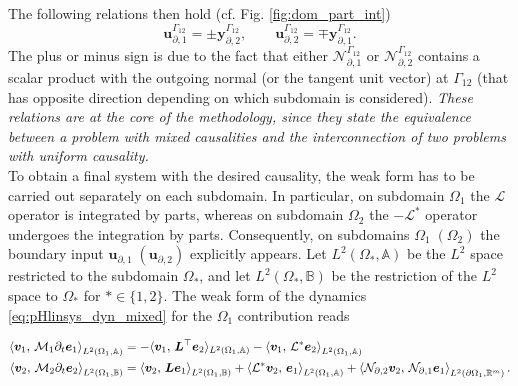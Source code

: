 The following relations then hold (cf. Fig. \ref{fig:dom_part_int})
\begin{equation}\label{eq:int_var}
\bm{u}_{\partial, 1}^{\Gamma_{12}} =\pm \bm{y}_{\partial, 2}^{\Gamma_{12}}, \qquad \bm{u}_{\partial, 2}^{\Gamma_{12}} = \mp \bm{y}_{\partial, 1}^{\Gamma_{12}}.
\end{equation}
The plus or minus sign is due to the fact that either $\mathcal{N}_{\partial, 1}^{\Gamma_{12}}$ or $\mathcal{N}_{\partial, 2}^{\Gamma_{12}}$ contains a scalar product with the outgoing normal (or the tangent unit vector) at ${\Gamma_{12}}$ (that has opposite direction depending on which subdomain is considered). \textit{These relations are at the core of the methodology, since they state the equivalence between a problem with mixed causalities and the interconnection of two problems with uniform causality.}   \\

To obtain a final system with the desired causality, the weak form has to be carried out separately on each subdomain. In particular, on subdomain $\Omega_1$ the $\mathcal{L}$ operator is integrated by parts, whereas on subdomain $\Omega_2$ the $-\mathcal{L}^*$ operator undergoes the integration by parts. Consequently, on subdomains $\Omega_1 \; (\Omega_2)$ the boundary input $\bm{u}_{\partial, 1} \; (\bm{u}_{\partial, 2})$ explicitly appears. Let $L^2(\Omega_*, \mathbb{A})$ be the $L^2$ space restricted to the subdomain $\Omega_*$, and let $L^2(\Omega_*, \mathbb{B})$ be the restriction of the $L^2$ space to $\Omega_*$ for $* \in \{1,2\}$. The weak form of the dynamics \eqref{eq:pHlinsys_dyn_mixed} for the $\Omega_1$ contribution reads

\begin{equation}\label{eq:pHlinsys_weak_Om1}
\begin{aligned}
\inner[L^2(\Omega_1, \mathbb{A})]{\bm{v}_1}{\mathcal{M}_1 \partial_t \bm{e}_1} &=   -  \langle{\bm{v}_1}, \,{\bm{L}^\top \bm{e}_2}\rangle_{L^2(\Omega_1, \mathbb{A})}  -\inner[L^2(\Omega_1, \mathbb{A})]{\bm{v}_1}{\mathcal{L}^*\bm{e}_2}  \\
\inner[L^2(\Omega_1, \mathbb{B})]{\bm{v}_2}{\mathcal{M}_2 \partial_t \bm{e}_2} &=   \inner[L^2(\Omega_1, \mathbb{B})]{\bm{v}_2}{\bm{L}\bm{e}_1} + \inner[L^2(\Omega_1, \mathbb{A})]{\mathcal{L}^*\bm{v}_2}{\bm{e}_1} + \inner[L^2(\partial\Omega_1, \mathbb{R}^m)]{\mathcal{N}_{\partial, 2} \bm{v}_2}{\mathcal{N}_{\partial, 1}\bm{e}_1}. \\
\end{aligned}
\end{equation}

